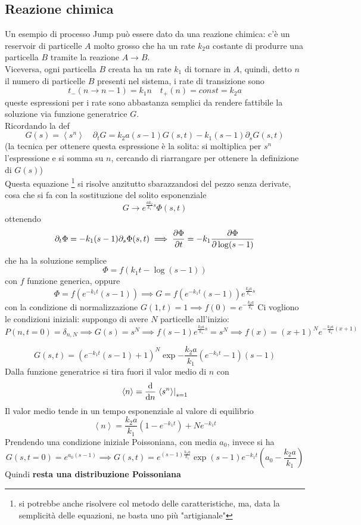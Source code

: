 \documentclass[a4paper,12pt]{article}
\newcommand{\eva}[2]{\left.#1\right|_{#2}}
\theoremstyle{plain}
\theoremstyle{definition}
\newcommand{\f}[2]{\frac{#1}{#2}}
\newcommand{\ave}[1]{\left\langle#1\right\rangle }
\newcommand{\tdv}{\partial_t}
\newcommand{\ra}{\rightarrow}
\theoremstyle{remark}
\begin{document}
\subsection{Reazione chimica}
\label{pampam}
Un esempio di processo Jump può essere dato da una reazione chimica: c'è un reservoir di particelle $A$ molto grosso che ha un rate $k_2a$ costante di produrre una particella $B$ tramite la reazione $A\ra B$.\\Viceversa, ogni particella $B$ creata ha un rate $k_1$ di tornare in $A$, quindi, detto $n$ il numero di particelle $B$ presenti nel sistema, i rate di transizione sono
\[t_-(n\ra n-1)=k_1 n\quad	t_+(n)=const =k_2a	\]
queste espressioni per i rate sono abbastanza semplici da rendere fattibile la soluzione via funzione generatrice $G$.	\\ Ricordando la def
\[G(s)=\ave{s^n}\quad 	\tdv G= k_2 a (s-1 ) G(s,t)-k_1 (s-1)	\partial_s G(s,t)	\]
(la tecnica per ottenere questa espressione è la solita: si moltiplica per $s^n$ l'espressione e si somma su $n$, cercando di riarrangare per ottenere la definizione di $G(s)$)\\
Questa equazione \footnote{si potrebbe anche risolvere col metodo delle caratteristiche, ma, data la semplicità delle equazioni, ne basta uno più "artigianale"} si risolve anzitutto sbarazzandosi del pezzo senza derivate, cosa che si fa con la sostituzione del solito esponenziale
\[G\ra	e^{\f{a k_2}{k_1}s}\Phi(s,t)	\]
ottenendo
\[	\tdv \Phi= -k_1 (s-1)	\partial_s \Phi(s,t)\implies\pdv{\Phi}{t}=-k_1\pdv{\Phi}{\log(s-1)}\]
che ha la soluzione semplice 
\[\Phi=f(k_1t-\log(s-1))\]
con $f$ funzione generica, oppure
\[\Phi=f(e^{-k_1t}(s-1))\implies G=f(e^{-k_1t}(s-1))e^{\f{k_2a}{k_1}s}\]
con la condizione di normalizzazione $G(1,t)=1\implies f(0)=e^{-\f{k_2a}{k_1}}$
Ci vogliono le condizioni iniziali: suppongo di avere $N$ particelle all'inizio:
\[P(n,t=0)=\delta_{n,N}\implies G(s)=s^N\implies f(s-1)e^{\f{k_2 a}{k_1}s}=s^N\implies f(x)=(x+1)^Ne^{-\f{k_2 a}{k_1}(x+1)}\]

\[G(s,t)=(e^{-k_1t}(s-1)+1)^N\exp{-\f{k_2 a}{k_1}(e^{-k_1t}-1)(s-1)}\]
Dalla funzione generatrice si tira fuori il valor medio di $n$ con
\[\ave{n}=\dv{n}\eva{\ave{s^n}}{s=1}\]
Il valor medio tende in un tempo esponenziale al valore di equilibrio
\[\ave{n}=\f{k_2 a}{k_1}(1-e^{-k_1 t})+N e^{-k_1t}\]
Prendendo una condizione iniziale Poissoniana, con media $a_0$, invece si ha
\[G(s,t=0)=e^{a_0(s-1)}\implies G(s,t)=e^{(s-1)\f{k_2 a}{k_1}} \exp{(s-1) e^{-k_1t}(a_0-\f{k_2a}{k_1})}\]
Quindi \textbf{resta una distribuzione Poissoniana}
\end{document}

